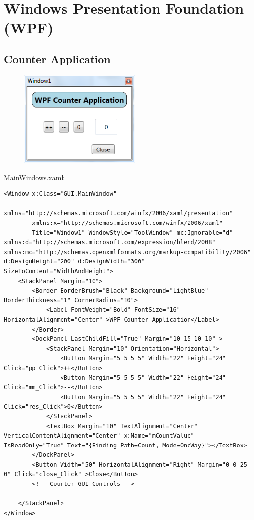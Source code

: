 \newpage
\section{Windows Presentation Foundation (WPF)}

\subsection{Counter Application}

\begin{figure}[htbp]
	\centering
	\includegraphics[width=6cm]{images/WPF_Counter.png}
\end{figure}

MainWindows.xaml:
\begin{lstlisting}[style=Csharp]
<Window x:Class="GUI.MainWindow"
        xmlns="http://schemas.microsoft.com/winfx/2006/xaml/presentation"
        xmlns:x="http://schemas.microsoft.com/winfx/2006/xaml"
        Title="Window1" WindowStyle="ToolWindow" mc:Ignorable="d" xmlns:d="http://schemas.microsoft.com/expression/blend/2008" xmlns:mc="http://schemas.openxmlformats.org/markup-compatibility/2006" d:DesignHeight="200" d:DesignWidth="300" SizeToContent="WidthAndHeight">
    <StackPanel Margin="10">
        <Border BorderBrush="Black" Background="LightBlue" BorderThickness="1" CornerRadius="10">
            <Label FontWeight="Bold" FontSize="16" HorizontalAlignment="Center" >WPF Counter Application</Label>
        </Border>
        <DockPanel LastChildFill="True" Margin="10 15 10 10" >
            <StackPanel Margin="10" Orientation="Horizontal">
                <Button Margin="5 5 5 5" Width="22" Height="24" Click="pp_Click">++</Button>
                <Button Margin="5 5 5 5" Width="22" Height="24" Click="mm_Click">--</Button>
                <Button Margin="5 5 5 5" Width="22" Height="24" Click="res_Click">0</Button>
            </StackPanel>
            <TextBox Margin="10" TextAlignment="Center" VerticalContentAlignment="Center" x:Name="mCountValue" IsReadOnly="True" Text="{Binding Path=Count, Mode=OneWay}"></TextBox>
        </DockPanel>
        <Button Width="50" HorizontalAlignment="Right" Margin="0 0 25 0" Click="close_Click" >Close</Button>
        <!-- Counter GUI Controls -->

    </StackPanel>
</Window>
\end{lstlisting}

